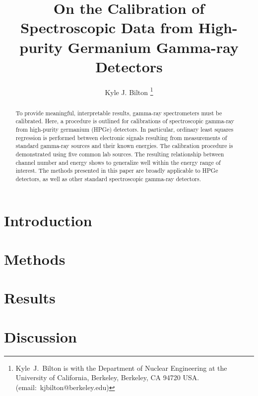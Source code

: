 \documentclass[journal,draftcls,onecolumn]{IEEEtran}
\title{On the Calibration of Spectroscopic Data from High-purity Germanium Gamma-ray Detectors}
\author{Kyle J. Bilton%
\thanks{Kyle~J.~Bilton is with the Department of Nuclear Engineering at the University of California, Berkeley, Berkeley, CA 94720 USA. (email:~\mbox{kjbilton@berkeley.edu})}}
\begin{document}
\maketitle

\begin{abstract}
To provide meaningful, interpretable results, gamma-ray spectrometers must be calibrated.
Here, a procedure is outlined for calibrations of spectroscopic gamma-ray from high-purity germanium (HPGe) detectors.
In particular, ordinary least squares regression is performed between electronic signals resulting from measurements of standard gamma-ray sources and their known energies.
The calibration procedure is demonstrated using five common lab sources.
The resulting relationship between channel number and energy shows to generalize well within the energy range of interest.
The methods presented in this paper are broadly applicable to HPGe detectors, as well as other standard spectroscopic gamma-ray detectors.
\end{abstract}


\section{Introduction}
\label{sec:intro}


\section{Methods}
\label{sec:meth}


\section{Results}
\label{sec:res}


\section{Discussion}
\label{sec:disc}




\end{document}
